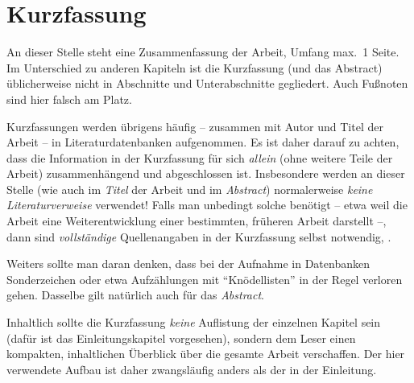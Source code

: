 \chapter{Kurzfassung}

An dieser Stelle steht eine Zusammenfassung der Arbeit, Umfang
max.\ 1 Seite. Im Unterschied zu anderen Kapiteln ist die
Kurzfassung (und das Abstract) üblicherweise nicht in Abschnitte
und Unterabschnitte gegliedert. 
Auch Fußnoten sind hier falsch am Platz.

Kurzfassungen werden übrigens häufig -- zusammen mit Autor und Titel
der Arbeit -- %
in Literaturdatenbanken aufgenommen. Es ist daher darauf zu
achten, dass die Information in der Kurzfassung für sich 
\emph{allein} (\dah ohne weitere Teile der Arbeit) zusammenhängend und
abgeschlossen ist. Insbesondere werden an dieser Stelle (wie \ua
auch im \emph{Titel} der Arbeit und im \emph{Abstract})
normalerweise \emph{keine Literaturverweise} verwendet! Falls man
unbedingt solche benötigt -- etwa weil die Arbeit eine
Weiterentwicklung einer bestimmten, früheren Arbeit darstellt --,
dann sind \emph{vollständige} Quellenangaben in der Kurzfassung
selbst notwendig, .

Weiters sollte man daran denken, dass bei der Aufnahme in Datenbanken
Sonderzeichen oder etwa Aufzählungen mit "`Knödellisten"' in der
Regel verloren gehen. Dasselbe gilt natürlich auch für das 
\emph{Abstract}.


Inhaltlich sollte die Kurzfassung \emph{keine} Auflistung der
einzelnen Kapitel sein (dafür ist das Einleitungskapitel
vorgesehen), sondern dem Leser einen kompakten, inhaltlichen
Überblick über die gesamte Arbeit verschaffen. Der hier verwendete
Aufbau ist daher zwangsläufig anders als der in der Einleitung.
